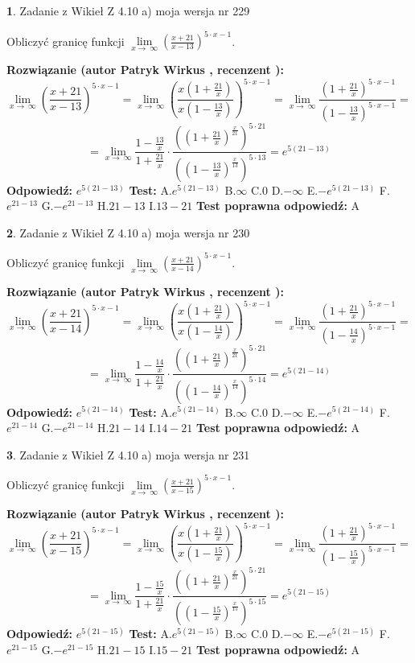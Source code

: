 \documentclass[12pt, a4paper]{article}
\theoremstyle{definition} %
\newtheorem{zad}{}
\newcommand{\zadStart}[1]{\begin{zad}#1\newline}
\newcommand{\zadStop}{\end{zad}}
\newcommand{\rozwStart}[2]{\noindent \textbf{Rozwiązanie (autor #1 , recenzent #2): }\newline}
\newcommand{\rozwStop}{\newline}
\newcommand{\odpStart}{\noindent \textbf{Odpowiedź:}\newline}
\newcommand{\odpStop}{\newline}
\newcommand{\testStart}{\noindent \textbf{Test:}\newline}
\newcommand{\testStop}{\newline}
\newcommand{\kluczStart}{\noindent \textbf{Test poprawna odpowiedź:}\newline}
\newcommand{\kluczStop}{\newline}
\begin{document}
\zadStart{Zadanie z Wikieł Z 4.10 a) moja wersja nr 229}


Obliczyć granicę funkcji  $\lim\limits_{x\to\ \infty}(\frac{x+21}{x-13})^{5\cdot x-1}$.
\zadStop
\rozwStart{Patryk Wirkus}{}
$$\lim\limits_{x\to\ \infty}(\frac{x+21}{x-13})^{5\cdot x-1} = \lim\limits_{x\to\ \infty}(\frac{x(1+\frac{21}{x})}{x(1-\frac{13}{x})})^{5\cdot x-1}=\lim\limits_{x\to\ \infty}\frac{(1+\frac{21}{x})^{5\cdot x-1}}{(1-\frac{13}{x})^{5\cdot x-1}}=$$
$$=\lim\limits_{x\to\ \infty}\frac{1-\frac{13}{x}}{1+\frac{21}{x}}\cdot\frac{((1+\frac{21}{x})^{\frac{x}{21}})^{5\cdot21}}{((1-\frac{13}{x})^{\frac{x}{13}})^{5\cdot13}}=e^{5(21-13)}$$
\rozwStop
\odpStart
$e^{5(21-13)}$
\odpStop
\testStart
A.$e^{5(21-13)}$ B.$\infty$ C.$0$ D.$-\infty$ E.$-e^{5(21-13)}$
F.$e^{21-13}$ G.$-e^{21-13}$
H.$21-13$
I.$13-21$
\testStop
\kluczStart
A
\kluczStop



\zadStart{Zadanie z Wikieł Z 4.10 a) moja wersja nr 230}


Obliczyć granicę funkcji  $\lim\limits_{x\to\ \infty}(\frac{x+21}{x-14})^{5\cdot x-1}$.
\zadStop
\rozwStart{Patryk Wirkus}{}
$$\lim\limits_{x\to\ \infty}(\frac{x+21}{x-14})^{5\cdot x-1} = \lim\limits_{x\to\ \infty}(\frac{x(1+\frac{21}{x})}{x(1-\frac{14}{x})})^{5\cdot x-1}=\lim\limits_{x\to\ \infty}\frac{(1+\frac{21}{x})^{5\cdot x-1}}{(1-\frac{14}{x})^{5\cdot x-1}}=$$
$$=\lim\limits_{x\to\ \infty}\frac{1-\frac{14}{x}}{1+\frac{21}{x}}\cdot\frac{((1+\frac{21}{x})^{\frac{x}{21}})^{5\cdot21}}{((1-\frac{14}{x})^{\frac{x}{14}})^{5\cdot14}}=e^{5(21-14)}$$
\rozwStop
\odpStart
$e^{5(21-14)}$
\odpStop
\testStart
A.$e^{5(21-14)}$ B.$\infty$ C.$0$ D.$-\infty$ E.$-e^{5(21-14)}$
F.$e^{21-14}$ G.$-e^{21-14}$
H.$21-14$
I.$14-21$
\testStop
\kluczStart
A
\kluczStop



\zadStart{Zadanie z Wikieł Z 4.10 a) moja wersja nr 231}


Obliczyć granicę funkcji  $\lim\limits_{x\to\ \infty}(\frac{x+21}{x-15})^{5\cdot x-1}$.
\zadStop
\rozwStart{Patryk Wirkus}{}
$$\lim\limits_{x\to\ \infty}(\frac{x+21}{x-15})^{5\cdot x-1} = \lim\limits_{x\to\ \infty}(\frac{x(1+\frac{21}{x})}{x(1-\frac{15}{x})})^{5\cdot x-1}=\lim\limits_{x\to\ \infty}\frac{(1+\frac{21}{x})^{5\cdot x-1}}{(1-\frac{15}{x})^{5\cdot x-1}}=$$
$$=\lim\limits_{x\to\ \infty}\frac{1-\frac{15}{x}}{1+\frac{21}{x}}\cdot\frac{((1+\frac{21}{x})^{\frac{x}{21}})^{5\cdot21}}{((1-\frac{15}{x})^{\frac{x}{15}})^{5\cdot15}}=e^{5(21-15)}$$
\rozwStop
\odpStart
$e^{5(21-15)}$
\odpStop
\testStart
A.$e^{5(21-15)}$ B.$\infty$ C.$0$ D.$-\infty$ E.$-e^{5(21-15)}$
F.$e^{21-15}$ G.$-e^{21-15}$
H.$21-15$
I.$15-21$
\testStop
\kluczStart
A
\kluczStop
\end{document}
